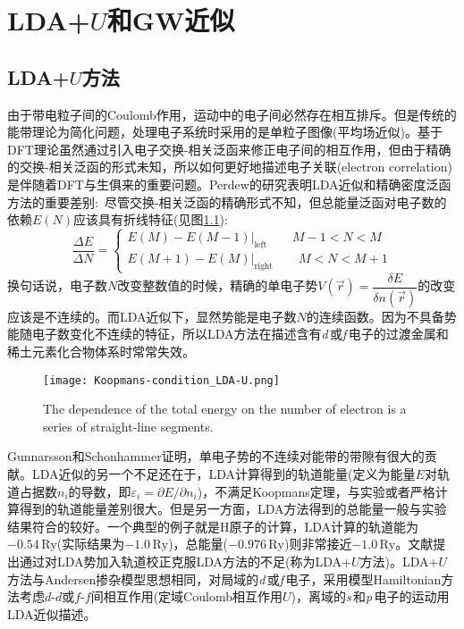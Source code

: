 \chapter{LDA+$U$和GW近似}
\section{LDA+$U$方法}
由于带电粒子间的\textrm{Coulomb}作用，运动中的电子间必然存在相互排斥。但是传统的能带理论为简化问题，处理电子系统时采用的是单粒子图像(平均场近似)。基于\textrm{DFT}理论虽然通过引入电子交换-相关泛函来修正电子间的相互作用，但由于精确的交换-相关泛函的形式未知，所以如何更好地描述电子关联(electron correlation)是伴随着\textrm{DFT}与生俱来的重要问题。\textrm{Perdew}的研究表明LDA近似和精确密度泛函方法的重要差别\cite{PRL49-1691_1982}:~尽管交换-相关泛函的精确形式不知，但总能量泛函对电子数的依赖$E(N)$应该具有折线特征(见图\ref{exact-DFT}):~
	\begin{displaymath}
		\dfrac{\Delta E}{\Delta N}=\left\{
		\begin{aligned}
			E(M)-E(M-1)|_{\mathrm{left}}\qquad M-1<N<M\\
			E(M+1)-E(M)|_{\mathrm{right}}\qquad M<N<M+1 
		\end{aligned}\right.
	\end{displaymath}
换句话说，电子数$N$改变整数值的时候，精确的单电子势$V(\vec r)=\dfrac{\delta E}{\delta n(\vec r)}$的改变应该是不连续的。而LDA近似下，显然势能是电子数$N$的连续函数。因为不具备势能随电子数变化不连续的特征，所以LDA方法在描述含有{\textit d}\,或{\textit f}\,电子的过渡金属和稀土元素化合物体系时常常失效。

\begin{figure}[h!]
\centering
\vspace*{-0.4in}
\texttt{[image: Koopmans-condition\_LDA-U.png]}
\caption{\small \textrm{The dependence of the total energy on the number of electron is a series of straight-line segments.}}%
\label{exact-DFT}
\end{figure}

Gunnarsson和Schonhammer\cite{PRL56-1968_1986}证明，单电子势的不连续对能带的带隙有很大的贡献。LDA近似的另一个不足还在于，LDA计算得到的轨道能量(定义为能量$E$对轨道占据数$n_i$的导数，即$\varepsilon_i=\partial E/\partial n_i$)，不满足\textrm{Koopmans}定理，与实验或者严格计算得到的轨道能量差别很大。但是另一方面，LDA方法得到的总能量一般与实验结果符合的较好。一个典型的例子就是\textrm{H}原子的计算，LDA计算的轨道能为$-0.54\,\mathrm{Ry}$(实际结果为$-1.0\,\mathrm{Ry}$)，总能量($-0.976\,\mathrm{Ry}$)则非常接近$-1.0\,\mathrm{Ry}$\cite{PRB37-9919_1988}。文献提出通过对LDA势加入轨道校正克服LDA方法的不足(称为LDA+$U$方法)。LDA+$U$方法与\textrm{Andersen}掺杂模型\cite{PR124-41_1961}思想相同，对局域的{\textit d}\,或{\textit f}\,电子，采用模型Hamiltonian方法考虑$d$-$d$或$f$-$f$间相互作用(定域Coulomb相互作用$U$)，离域的{\textit s}\,和{\textit p}\,电子的运动用LDA近似描述。

